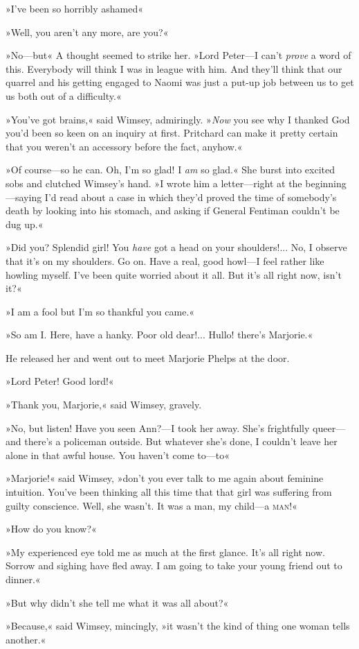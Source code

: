 »I've been so horribly ashamed\longdash«

»Well, you aren't any more, are you?«

»No—but\longdash« A thought seemed to strike her. »Lord Peter—I can't \textit{prove} a word of this. Everybody will think I was in league with him. And they'll think that our quarrel and his getting engaged to Naomi was just a put-up job between us to get us both out of a difficulty.«

»You've got brains,« said Wimsey, admiringly. »\textit{Now} you see why I thanked God you'd been so keen on an inquiry at first. Pritchard can make it pretty certain that you weren't an accessory before the fact, anyhow.«

»Of course—so he can. Oh, I'm so glad! I \textit{am} so glad.« She burst into excited sobs and clutched Wimsey's hand. »I wrote him a letter—right at the beginning—saying I'd read about a case in which they'd proved the time of somebody's death by looking into his stomach, and asking if General Fentiman couldn't be dug up.«

»Did you? Splendid girl! You \textit{have} got a head on your shoulders!... No, I observe that it's on my shoulders. Go on. Have a real, good howl—I feel rather like howling myself. I've been quite worried about it all. But it's all right now, isn't it?«

»I am a fool \textellipsis  but I'm so thankful you came.«

»So am I. Here, have a hanky. Poor old dear!... Hullo! there's Marjorie.«

He released her and went out to meet Marjorie Phelps at the door.

»Lord Peter! Good lord!«

»Thank you, Marjorie,« said Wimsey, gravely.

»No, but listen! Have you seen Ann?—I took her away. She's frightfully queer—and there's a policeman outside. But whatever she's done, I couldn't leave her alone in that awful house. You haven't come to—to\longdash«

»Marjorie!« said Wimsey, »don't you ever talk to me again about feminine intuition. You've been thinking all this time that that girl was suffering from guilty conscience. Well, she wasn't. It was a man, my child—a \textsc{man}!«

»How do you know?«

»My experienced eye told me as much at the first glance. It's all right now. Sorrow and sighing have fled away. I am going to take your young friend out to dinner.«

»But why didn't she tell me what it was all about?«

»Because,« said Wimsey, mincingly, »it wasn't the kind of thing one woman tells another.«